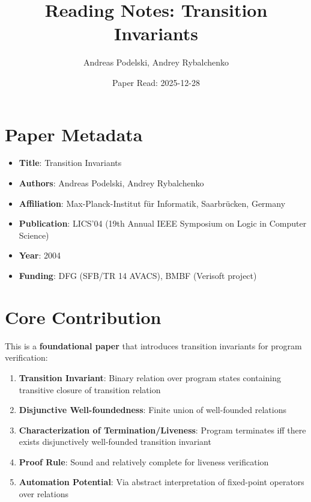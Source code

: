 \documentclass{article}
\title{Reading Notes: Transition Invariants}
\author{Andreas Podelski, Andrey Rybalchenko}
\date{Paper Read: 2025-12-28}
\begin{document}
\maketitle

\section{Paper Metadata}

\begin{itemize}
    \item \textbf{Title}: Transition Invariants
    \item \textbf{Authors}: Andreas Podelski, Andrey Rybalchenko
    \item \textbf{Affiliation}: Max-Planck-Institut für Informatik, Saarbrücken, Germany
    \item \textbf{Publication}: LICS'04 (19th Annual IEEE Symposium on Logic in Computer Science)
    \item \textbf{Year}: 2004
    \item \textbf{Funding}: DFG (SFB/TR 14 AVACS), BMBF (Verisoft project)
\end{itemize}

\section{Core Contribution}

This is a \textbf{foundational paper} that introduces transition invariants for program verification:

\begin{enumerate}
    \item \textbf{Transition Invariant}: Binary relation over program states containing transitive closure of transition relation

    \item \textbf{Disjunctive Well-foundedness}: Finite union of well-founded relations

    \item \textbf{Characterization of Termination/Liveness}: Program terminates iff there exists disjunctively well-founded transition invariant

    \item \textbf{Proof Rule}: Sound and relatively complete for liveness verification

    \item \textbf{Automation Potential}: Via abstract interpretation of fixed-point operators over relations
\end{enumerate}
\end{document}
